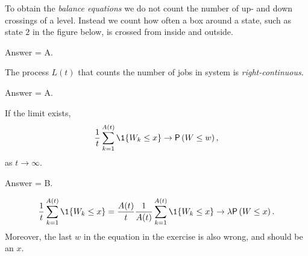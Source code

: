 \begin{exercise}[201802]
To obtain the \emph{ balance equations} we do not count the number of up- and down crossings of a level. Instead we count how often a box around a state, such as state $2$ in the figure below, is crossed from inside and outside. 

\begin{center}
  \end{center}
\begin{solution}
Answer = A.
\end{solution}
\end{exercise}

\begin{exercise}[201802]
The process  $L(t)$ that counts the number of jobs in system is \emph{right-continuous}.
\begin{solution}
Answer = A.
\end{solution}
\end{exercise}


\begin{exercise}[201803]
If the limit exists, 
\begin{equation*}
  \frac{1}{t} \sum_{k=1}^{A(t)} \1{W_k \leq x} \to \P{W\leq w},
\end{equation*}
as $t\to \infty$. 
\begin{solution}
Answer = B.

\begin{equation*}
  \frac{1}{t} \sum_{k=1}^{A(t)} \1{W_k \leq x}  = 
  \frac{A(t)}{t} \frac 1{A(t)}\sum_{k=1}^{A(t)} \1{W_k \leq x} \to \lambda \P{W\leq x}.
\end{equation*}
Moreover, the last $w$ in the equation in the exercise is also wrong, and should be an $x$.
\end{solution}
\end{exercise}


